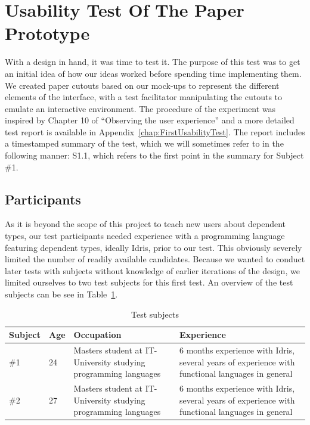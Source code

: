 \section{Usability Test Of The Paper Prototype}
\label{sec:UsabilityTest}
With a design in hand, it was time to test it. The purpose of this test was to
get an initial idea of how our ideas worked before spending time implementing
them. We created paper cutouts based on our mock-ups to represent the different
elements of the interface, with a test facilitator manipulating the cutouts to
emulate an interactive environment. The procedure of the experiment was inspired by Chapter 10 of ``Observing the user experience''\cite{kuniavsky2003observing} and a more detailed test report is available in Appendix~\ref{chap:FirstUsabilityTest}. The report includes a timestamped summary of the test, which we
will sometimes refer to in the following manner: S1.1, which refers to the
first point in the summary for Subject \#1.

\subsection{Participants}
As it is beyond the scope of this project to teach new users about dependent
types, our test participants needed experience with a programming language
featuring dependent types, ideally Idris, prior to our test. This obviously
severely limited the number of readily available candidates. Because we wanted
to conduct later tests with subjects without knowledge of earlier iterations of
the design, we limited ourselves to two test subjects for this first test. An
overview of the test subjects can be see in Table~\ref{table:first_test_subjects}.

\begin{table}
\centering
\begin{tabular}{| l | l | p{5cm} | p{5cm} |}
\hline
Subject & Age & Occupation & Experience \\ \hline
\#1 & 24 & Masters student at IT-University studying programming languages & 6 months experience with Idris, several years of experience with functional languages in general \\ \hline
\#2 & 27 & Masters student at IT-University studying programming languages & 6 months experience with Idris, several years of experience with functional languages in general \\ \hline
\end{tabular}
\caption{Test subjects}
\label{table:first_test_subjects}
\end{table}

